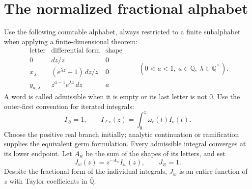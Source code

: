 \documentclass[11pt,a4paper]{article}
\newcommand{\Qbar}{\overline{\mathbb Q}}
\theoremstyle{definition}
\theoremstyle{remark}
\numberwithin{equation}{section}
\begin{document}
\section{The normalized fractional alphabet}
Use the following countable alphabet, always restricted to a finite
subalphabet when applying a finite-dimensional theorem:
\[
 \begin{array}{c|c|c}
 \text{letter}&\text{differential form}&\text{shape}\\\hline
 0&dz/z&0\\
 x_\lambda&(e^{\lambda z}-1)\,dz/z&0\\
 y_{a,\lambda}&z^{a-1}e^{\lambda z}\,dz&a
 \end{array}
 \qquad(0<a<1,\ a\in\mathbb Q,\ \lambda\in\Qbar^\times).
\]
A word is called admissible when it is empty or its last letter is not $0$.
Use the outer-first convention for iterated integrals:
\[
 I_\varnothing=1,\qquad
 I_{\ell v}(z)=\int_0^z\omega_\ell(t)I_v(t).
\]
Choose the positive real branch initially; analytic continuation or
ramification supplies the equivalent germ formulation. Every admissible
integral converges at its lower endpoint. Let $A_w$ be the sum of the
shapes of its letters, and set
\begin{equation}
 J_w(z)=z^{-A_w}I_w(z),\qquad J_\varnothing=1.
 \label{core:eq:normalization}
\end{equation}
Despite the fractional form of the individual integrals, $J_w$ is an
entire function of $z$ with Taylor coefficients in $\Qbar$.
\end{document}
